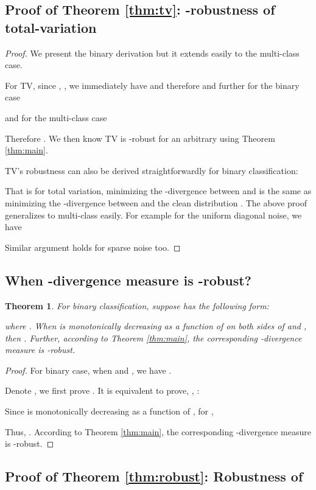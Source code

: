\documentclass{article}
\newtheorem{theorem}{Theorem}
\begin{document}
\subsection{Proof of Theorem \ref{thm:tv}: -robustness of total-variation}
\begin{proof}
We present the binary derivation but it extends easily to the multi-class case.  


For TV, since  , , we immediately have 
 and therefore 
and further for the binary case

and for the multi-class case

Therefore . We then know TV is -robust for an arbitrary  using Theorem \ref{thm:main}.

TV's robustness can also be derived straightforwardly for binary classification:

That is for total variation, minimizing the -divergence between  and  is the same as minimizing the -divergence between  and the clean distribution .
The above proof generalizes to multi-class easily. 
For example for the uniform diagonal noise, we have

Similar argument holds for sparse noise too. 


\end{proof}

\subsection{When -divergence measure is -robust?}
\begin{theorem}
\label{thm:bias}
For binary classification, suppose  has the following form:

where . When  is monotonically decreasing as a function of  on both sides of  and , then . Further, according to Theorem \ref{thm:main}, the corresponding -divergence measure is -robust.
\end{theorem}
\begin{proof}
For binary case, when  and , we have .

Denote , we first prove . It is equivalent to prove, , :


Since  is monotonically decreasing as a function of , for ,



Thus, . According to Theorem \ref{thm:main}, the corresponding -divergence measure is -robust.

\end{proof}


\subsection{Proof of Theorem \ref{thm:robust}: Robustness of }
\end{document}
